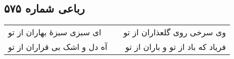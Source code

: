 \begin{center}
\section*{رباعی شماره ۵۷۵}
\label{sec:sh575}
\begin{longtable}{l p{0.5cm} r}
ای سبزی سبزهٔ بهاران از تو
&&
وی سرخی روی گلعذاران از تو
\\
آه دل و اشک بی قراران از تو
&&
فریاد که باد از تو و باران از تو
\\
\end{longtable}
\end{center}
